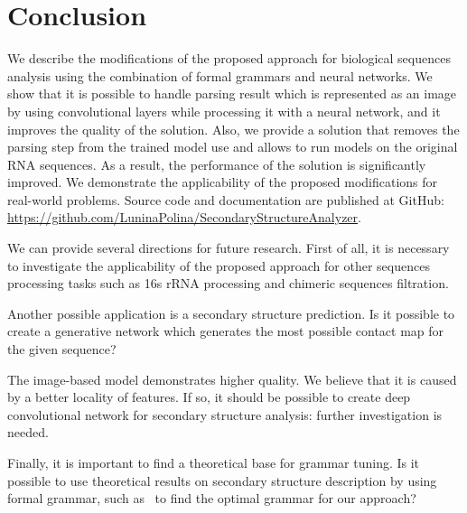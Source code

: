 \documentclass[runningheads]{llncs}
\begin{document}


\section{Conclusion}
We describe the modifications of the proposed approach for biological sequences analysis using the combination of formal grammars and neural networks.
We show that it is possible to handle parsing result which is represented as an image by using convolutional layers while processing it with a neural network, and it improves the quality of the solution.
Also, we provide a solution that removes the parsing step from the trained model use and allows to run models on the original RNA sequences.
As a result, the performance of the solution is significantly improved.
We demonstrate the applicability of the proposed modifications for real-world problems.
Source code and documentation are published at GitHub: \url{https://github.com/LuninaPolina/SecondaryStructureAnalyzer}.

We can provide several directions for future research.
First of all, it is necessary to investigate the applicability of the proposed approach for other sequences processing tasks such as 16s rRNA processing and chimeric sequences filtration.

Another possible application is a secondary structure prediction.
Is it possible to create a generative network which generates the most possible contact map for the given sequence?

The image-based model demonstrates higher quality.
We believe that it is caused by a better locality of features.
If so, it should be possible to create deep convolutional network for secondary structure analysis: further investigation is needed.

Finally, it is important to find a theoretical base for grammar tuning.
Is it possible to use theoretical results on secondary structure description by using formal grammar, such as~\cite{MQbioinformatics19} to find the optimal grammar for our approach?
%
%
%


%
\end{document}
